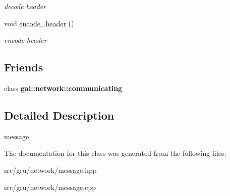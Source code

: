 \begin{DoxyCompactItemize}
\begin{DoxyCompactList}\small\item\em decode header \end{DoxyCompactList}\item 
\hypertarget{classgal_1_1network_1_1message_a1bf10df7093930f183100b78a0251cd2}{void \hyperlink{classgal_1_1network_1_1message_a1bf10df7093930f183100b78a0251cd2}{encode\-\_\-header} ()}\label{classgal_1_1network_1_1message_a1bf10df7093930f183100b78a0251cd2}

\begin{DoxyCompactList}\small\item\em encode header \end{DoxyCompactList}\end{DoxyCompactItemize}
\subsection*{\-Friends}
\begin{DoxyCompactItemize}
\item 
\hypertarget{classgal_1_1network_1_1message_a8963f6c475f2812300781c41bc93ae55}{class {\bfseries gal\-::network\-::communicating}}\label{classgal_1_1network_1_1message_a8963f6c475f2812300781c41bc93ae55}

\end{DoxyCompactItemize}


\subsection{\-Detailed \-Description}
message 

\-The documentation for this class was generated from the following files\-:\begin{DoxyCompactItemize}
\item 
src/gru/network/message.\-hpp\item 
src/gru/network/message.\-cpp\end{DoxyCompactItemize}
